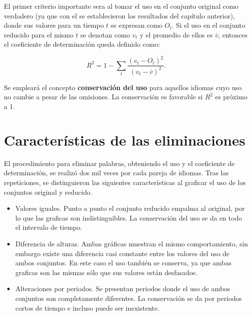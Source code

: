 El primer criterio importante sera al tomar el uso en el conjunto original como verdadero (ya que con el se establecieron los resultados del capítulo anterior),  donde sus valores para un tiempo $t$ se expresan como $O_{t}$. Si el uso en el conjunto reducido para el mismo $t$ se denotan como  $v_{t}$ y el promedio de ellos es $\bar{v}$, entonces  el coeficiente de determinación queda definido como:

\begin{equation}
\label{ec.dif_uso}
R^{2} = 1 - \sum_{t} \frac{ \left( v_{t}- O_{t} \right)^{2}  }{ \left( v_{t} - \bar{v} \right)^{2} }.
\end{equation}

Se empleará el concepto \textbf{conservación del uso} para aquellos idiomas cuyo uso no cambie a pesar de las omisiones. La conservación es favorable si $R^{2}$ es próximo a 1. 

\section{Características de las eliminaciones}

El procedimiento para eliminar palabras, obteniendo el uso y el coeficiente de determinación, se realizó dos mil veces por cada pareja de idiomas.  Tras las repeticiones, se distinguieron las siguientes características al graficar el uso de los conjuntos original y reducido. 


\begin{itemize}
	
	\item Valores iguales. Punto a punto el conjunto reducido empalma al original, por lo que las graficas son indistinguibles. La conservación del uso se da en todo el intervalo de tiempo. 
	
	\item Diferencia de alturas. Ambas gráficas muestran el mismo comportamiento, sin embargo existe una diferencia casi constante entre
	los valores del uso de ambos conjuntos. En este caso el uso también se conserva, ya que ambas graficas son las mismas sólo que sus valores están desfasados. 
	
	\item Alteraciones por periodos.  Se presentan periodos donde el uso de ambos conjuntos son completamente diferentes. La conservación se da por periodos cortos de tiempo e incluso puede ser inexistente.
	
\end{itemize}

